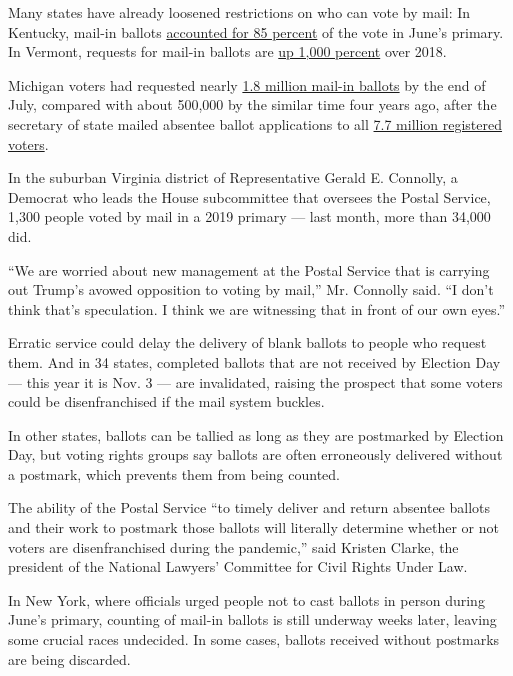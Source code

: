 Many states have already loosened restrictions on who can vote by mail:
In Kentucky, mail-in ballots
\href{https://www.whas11.com/article/news/local/kentucky-election-absentee-vote-turnout/417-23f2bb1e-ea9a-4c7e-8202-c33f54063ab6}{accounted
for 85 percent} of the vote in June's primary. In Vermont, requests for
mail-in ballots are
\href{https://www.sevendaysvt.com/OffMessage/archives/2020/07/03/absentee-ballot-requests-surge-in-vermont}{up
1,000 percent} over 2018.

Michigan voters had requested nearly
\href{https://www.michigan.gov/sos/0,4670,7-127--534590--,00.html}{1.8
million mail-in ballots} by the end of July, compared with about 500,000
by the similar time four years ago, after the secretary of state mailed
absentee ballot applications to all
\href{https://mvic.sos.state.mi.us/}{7.7 million registered voters}.

In the suburban Virginia district of Representative Gerald E. Connolly,
a Democrat who leads the House subcommittee that oversees the Postal
Service, 1,300 people voted by mail in a 2019 primary --- last month,
more than 34,000 did.

``We are worried about new management at the Postal Service that is
carrying out Trump's avowed opposition to voting by mail,'' Mr. Connolly
said. ``I don't think that's speculation. I think we are witnessing that
in front of our own eyes.''

Erratic service could delay the delivery of blank ballots to people who
request them. And in 34 states, completed ballots that are not received
by Election Day --- this year it is Nov. 3 --- are invalidated, raising
the prospect that some voters could be disenfranchised if the mail
system buckles.

In other states, ballots can be tallied as long as they are postmarked
by Election Day, but voting rights groups say ballots are often
erroneously delivered without a postmark, which prevents them from being
counted.

The ability of the Postal Service ``to timely deliver and return
absentee ballots and their work to postmark those ballots will literally
determine whether or not voters are disenfranchised during the
pandemic,'' said Kristen Clarke, the president of the National Lawyers'
Committee for Civil Rights Under Law.

In New York, where officials urged people not to cast ballots in person
during June's primary, counting of mail-in ballots is still underway
weeks later, leaving some crucial races undecided. In some cases,
ballots received without postmarks are being discarded.

